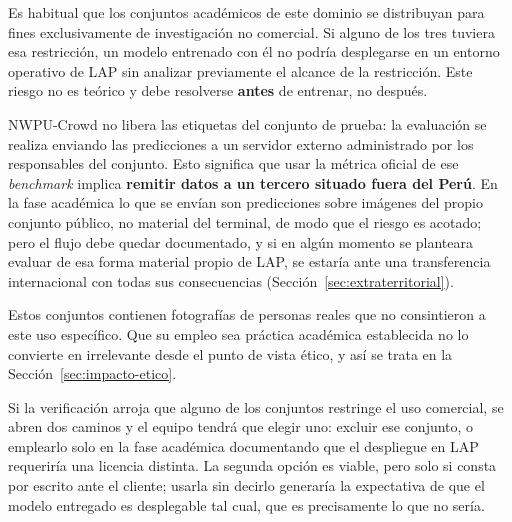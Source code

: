 \begin{description}[leftmargin=0pt,style=unboxed,itemsep=0.4em]
  \item[Riesgo de uso comercial.] Es habitual que los conjuntos
    académicos de este dominio se distribuyan para fines exclusivamente
    de investigación no comercial. Si alguno de los tres tuviera esa
    restricción, un modelo entrenado con él no podría desplegarse en un
    entorno operativo de LAP sin analizar previamente el alcance de la
    restricción. Este riesgo no es teórico y debe resolverse
    \textbf{antes} de entrenar, no después.
  \item[Riesgo de transferencia a un tercero en la evaluación.]
    NWPU-Crowd no libera las etiquetas del conjunto de prueba: la
    evaluación se realiza enviando las predicciones a un servidor externo
    administrado por los responsables del conjunto. Esto significa que
    usar la métrica oficial de ese \emph{benchmark} implica
    \textbf{remitir datos a un tercero situado fuera del Perú}. En la
    fase académica lo que se envían son predicciones sobre imágenes del
    propio conjunto público, no material del terminal, de modo que el
    riesgo es acotado; pero el flujo debe quedar documentado, y si en
    algún momento se planteara evaluar de esa forma material propio de
    LAP, se estaría ante una transferencia internacional con todas sus
    consecuencias (Sección~\ref{sec:extraterritorial}).
  \item[Riesgo sobre los titulares de las imágenes.] Estos conjuntos
    contienen fotografías de personas reales que no consintieron a este
    uso específico. Que su empleo sea práctica académica establecida no
    lo convierte en irrelevante desde el punto de vista ético, y así se
    trata en la Sección~\ref{sec:impacto-etico}.
\end{description}


Si la verificación arroja que alguno de los conjuntos restringe el uso
comercial, se abren dos caminos y el equipo tendrá que elegir uno:
excluir ese conjunto, o emplearlo solo en la fase académica documentando
que el despliegue en LAP requeriría una licencia distinta. La segunda
opción es viable, pero solo si consta por escrito ante el cliente; usarla
sin decirlo generaría la expectativa de que el modelo entregado es
desplegable tal cual, que es precisamente lo que no sería.


